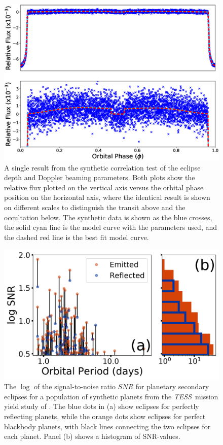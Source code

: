 \documentclass[manuscript]{aastex}
\newcommand{\tess}{{\it TESS}}
\begin{document}
\begin{figure}

\includegraphics[width=1.0\textwidth]{synthetic_fits_beaming_vary.eps}
\caption{A single result from the synthetic correlation test of the eclipse depth and Doppler beaming parameters. Both plots show the relative flux plotted on the vertical axis versus the orbital phase position on the horizontal axis, where the identical result is shown on different scales to distinguish the transit above and the occultation below. The synthetic data is shown as the blue crosses, the solid cyan line is the model curve with the parameters used, and the dashed red line is the best fit model curve.}

\end{figure}

\begin{figure}

\includegraphics[width=\textwidth]{eclipse_estimates.jpg}
\caption{The $\log$ of the signal-to-noise ratio $SNR$ for planetary secondary eclipses for a population of synthetic planets from the \tess\ mission yield study of \citet{2018arXiv180405050B}. The blue dots in (a)  show eclipses for perfectly reflecting planets, while the orange dots show eclipses for perfect blackbody planets, with black lines connecting the two eclipses for each planet. Panel (b) shows a histogram of SNR-values. \label{fig:eclipse_estimates}}

\end{figure}
\end{document}
